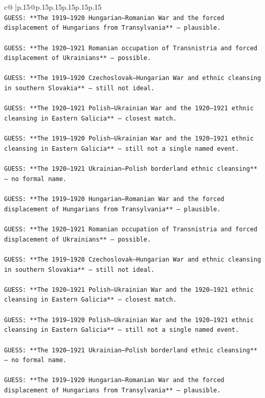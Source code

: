 \documentclass{article}
\begin{document}
{\begin{supertabular}{c@{$\;$}|p{.15\linewidth}@{}p{.15\linewidth}p{.15\linewidth}p{.15\linewidth}p{.15\linewidth}p{.15\linewidth}}
{{{\\ 
\texttt{GUESS: **The 1919–1920 Hungarian–Romanian War and the forced displacement of Hungarians from Transylvania** — plausible.} \\
\\ 
\texttt{GUESS: **The 1920–1921 Romanian occupation of Transnistria and forced displacement of Ukrainians** — possible.} \\
\\ 
\texttt{GUESS: **The 1919–1920 Czechoslovak–Hungarian War and ethnic cleansing in southern Slovakia** — still not ideal.} \\
\\ 
\texttt{GUESS: **The 1920–1921 Polish–Ukrainian War and the 1920–1921 ethnic cleansing in Eastern Galicia** — closest match.} \\
\\ 
\texttt{GUESS: **The 1919–1920 Polish–Ukrainian War and the 1920–1921 ethnic cleansing in Eastern Galicia** — still not a single named event.} \\
\\ 
\texttt{GUESS: **The 1920–1921 Ukrainian–Polish borderland ethnic cleansing** — no formal name.} \\
\\ 
\texttt{GUESS: **The 1919–1920 Hungarian–Romanian War and the forced displacement of Hungarians from Transylvania** — plausible.} \\
\\ 
\texttt{GUESS: **The 1920–1921 Romanian occupation of Transnistria and forced displacement of Ukrainians** — possible.} \\
\\ 
\texttt{GUESS: **The 1919–1920 Czechoslovak–Hungarian War and ethnic cleansing in southern Slovakia** — still not ideal.} \\
\\ 
\texttt{GUESS: **The 1920–1921 Polish–Ukrainian War and the 1920–1921 ethnic cleansing in Eastern Galicia** — closest match.} \\
\\ 
\texttt{GUESS: **The 1919–1920 Polish–Ukrainian War and the 1920–1921 ethnic cleansing in Eastern Galicia** — still not a single named event.} \\
\\ 
\texttt{GUESS: **The 1920–1921 Ukrainian–Polish borderland ethnic cleansing** — no formal name.} \\
\\ 
\texttt{GUESS: **The 1919–1920 Hungarian–Romanian War and the forced displacement of Hungarians from Transylvania** — plausible.} \\
}}}
\end{supertabular}}
\end{document}
